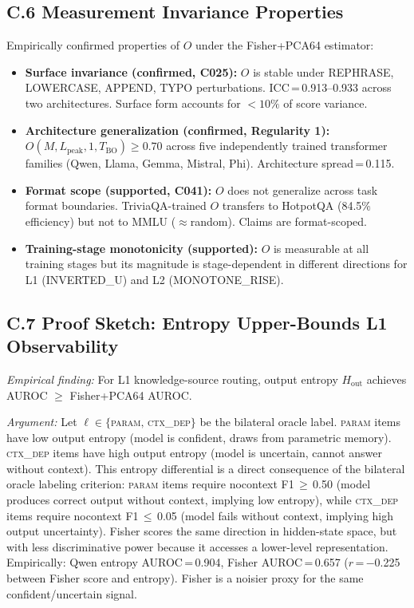\documentclass[11pt]{article}
\begin{document}
\subsection*{C.6 Measurement Invariance Properties}

Empirically confirmed properties of $O$ under the Fisher+PCA64 estimator:

\begin{itemize}
  \item \textbf{Surface invariance (confirmed, C025):} $O$ is stable under REPHRASE,
    LOWERCASE, APPEND, TYPO perturbations. ICC\,=\,0.913--0.933 across two architectures.
    Surface form accounts for $< 10\%$ of score variance.
  \item \textbf{Architecture generalization (confirmed, Regularity 1):} $O(M, L_{\text{peak}},
    1, T_{\text{BO}}) \geq 0.70$ across five independently trained transformer families
    (Qwen, Llama, Gemma, Mistral, Phi). Architecture spread\,=\,0.115.
  \item \textbf{Format scope (supported, C041):} $O$ does not generalize across task
    format boundaries. TriviaQA-trained $O$ transfers to HotpotQA (84.5\% efficiency)
    but not to MMLU ($\approx$random). Claims are format-scoped.
  \item \textbf{Training-stage monotonicity (supported):} $O$ is measurable at all
    training stages but its magnitude is stage-dependent in different directions for
    L1 (INVERTED\_U) and L2 (MONOTONE\_RISE).
\end{itemize}

\subsection*{C.7 Proof Sketch: Entropy Upper-Bounds L1 Observability}

\emph{Empirical finding:} For L1 knowledge-source routing, output entropy
$H_\text{out}$ achieves AUROC $\geq$ Fisher+PCA64 AUROC.

\emph{Argument:} Let $\ell \in \{$\textsc{param}$,\,$\textsc{ctx\_dep}$\}$ be the
bilateral oracle label. \textsc{param} items have low output entropy (model is confident,
draws from parametric memory). \textsc{ctx\_dep} items have high output entropy (model
is uncertain, cannot answer without context). This entropy differential is a direct
consequence of the bilateral oracle labeling criterion: \textsc{param} items require
nocontext F1\,$\geq$\,0.50 (model produces correct output without context, implying
low entropy), while \textsc{ctx\_dep} items require nocontext F1\,$\leq$\,0.05 (model
fails without context, implying high output uncertainty). Fisher scores the same
direction in hidden-state space, but with less discriminative power because it
accesses a lower-level representation. Empirically: Qwen entropy AUROC\,=\,0.904,
Fisher AUROC\,=\,0.657 ($r$\,=\,$-$0.225 between Fisher score and entropy). Fisher
is a noisier proxy for the same confident/uncertain signal.
\end{document}
